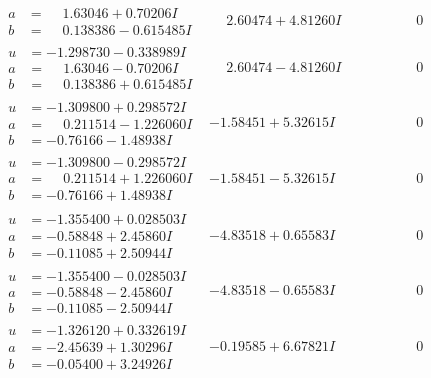 \documentclass[1p]{elsarticle_modified}
\theoremstyle{definition}
\begin{document}
$$\begin{array}{c|c|c}
\begin{aligned}
a &= \phantom{-}1.63046 + 0.70206 I \\
b &= \phantom{-}0.138386 - 0.615485 I\end{aligned}
 & \phantom{-}2.60474 + 4.81260 I & \phantom{-0.000000 } 0 \\ \hline\begin{aligned}
u &= -1.298730 - 0.338989 I \\
a &= \phantom{-}1.63046 - 0.70206 I \\
b &= \phantom{-}0.138386 + 0.615485 I\end{aligned}
 & \phantom{-}2.60474 - 4.81260 I & \phantom{-0.000000 } 0 \\ \hline\begin{aligned}
u &= -1.309800 + 0.298572 I \\
a &= \phantom{-}0.211514 - 1.226060 I \\
b &= -0.76166 - 1.48938 I\end{aligned}
 & -1.58451 + 5.32615 I & \phantom{-0.000000 } 0 \\ \hline\begin{aligned}
u &= -1.309800 - 0.298572 I \\
a &= \phantom{-}0.211514 + 1.226060 I \\
b &= -0.76166 + 1.48938 I\end{aligned}
 & -1.58451 - 5.32615 I & \phantom{-0.000000 } 0 \\ \hline\begin{aligned}
u &= -1.355400 + 0.028503 I \\
a &= -0.58848 + 2.45860 I \\
b &= -0.11085 + 2.50944 I\end{aligned}
 & -4.83518 + 0.65583 I & \phantom{-0.000000 } 0 \\ \hline\begin{aligned}
u &= -1.355400 - 0.028503 I \\
a &= -0.58848 - 2.45860 I \\
b &= -0.11085 - 2.50944 I\end{aligned}
 & -4.83518 - 0.65583 I & \phantom{-0.000000 } 0 \\ \hline\begin{aligned}
u &= -1.326120 + 0.332619 I \\
a &= -2.45639 + 1.30296 I \\
b &= -0.05400 + 3.24926 I\end{aligned}
 & -0.19585 + 6.67821 I & \phantom{-0.000000 } 0 \\ \hline\begin{aligned}

\end{aligned}
\end{array}$$
\end{document}
